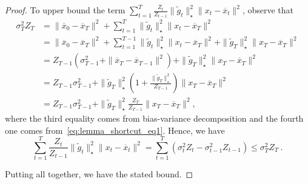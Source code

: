 \documentclass[12pt]{colt2018} %
\begin{document}
\begin{proof}
To upper bound the term $\sum_{t=1}^T \frac{Z_t}{Z_{t-1}}\|\tilde{g}_t\|_\star ^2\|x_t-\overline{x}_t\|^2$, observe that
\begin{align*}
\sigma_T^2 Z_T 
&=\|\overline{x}_0-\overline{x}_T\|^2+\sum_{t=1}^T \|\tilde{g}_t\|_\star ^2\|x_t-\overline{x}_T\|^2\\ 
&=\|\overline{x}_0-\overline{x}_T\|^2+\sum_{t=1}^{T-1} \|\tilde{g}_t\|_\star ^2\|x_t-\overline{x}_T\|^2 + \|\tilde{g}_T\|_\star ^2\|x_T-\overline{x}_T\|^2 \\
&= Z_{T-1}(\sigma_{T-1}^2+\|\overline{x}_T-\overline{x}_{T-1}\|^2) +\|\tilde{g}_T\|_\star ^2\|x_T-\overline{x}_T\|^2 \\
&= Z_{T-1}\sigma_{T-1}^2+\|\tilde{g}_T\|_\star ^2\left(1+\frac{\|\tilde{g}_T\|_\star ^2}{Z_{T-1}}\right)\|x_T-\overline{x}_T\|^2 \\
&= Z_{T-1}\sigma_{T-1}^2+\|\tilde{g}_T\|_\star ^2 \frac{Z_T}{Z_{T-1}} \|x_T-\overline{x}_T\|^2,
\end{align*}
where the third equality comes from bias-variance decomposition and the fourth one comes from~\eqref{eq:lemma_shortcut_eq1}. Hence, we have
\[
\sum_{t=1}^T \frac{Z_t}{Z_{t-1}} \|\tilde{g}_t\|_\star ^2\|x_t-\overline{x}_t\|^2 
= \sum_{t=1}^T (\sigma_t^2 Z_t - \sigma_{t-1}^2 Z_{t-1} ) \leq \sigma^2_T Z_T~.
\]

\begin{comment}
At the same time, we can use the boundedness of the domain to have
\begin{align*}
\sum_{t=1}^T \frac{\sqrt{Z_t} \|\tilde{g}_t\|_\star ^2}{Z_{t-1}}\|x_t-\overline{x}_t\|
&\leq \sum_{t=1}^T \frac{\sqrt{Z_t} \|\tilde{g}_t\|_\star ^2}{Z_{t-1}} D \\
&= D \sum_{t=1}^T \left(\frac{\sqrt{Z_t} \|\tilde{g}_t\|_\star ^2}{Z_{t}} + \frac{\sqrt{Z_t} \|\tilde{g}_t\|_\star ^2}{Z_{t-1}}-\frac{\sqrt{Z_t} \|\tilde{g}_t\|_\star ^2}{Z_{t}}\right)\\
&= D \sum_{t=1}^T \left(\frac{\|\tilde{g}_t\|_\star ^2}{\sqrt{Z_{t}}} + \frac{\sqrt{Z_t} \|\tilde{g}_t\|_\star ^2}{Z_{t-1}}-\frac{\sqrt{Z_t} \|\tilde{g}_t\|_\star ^2}{Z_{t}}\right)\\
&\leq D \sum_{t=1}^T \left(\frac{\|\tilde{g}_t\|_\star ^2}{\sqrt{Z_{t}}} + \frac{\sqrt{Z_T}}{Z_{t-1}}-\frac{\sqrt{Z_T}}{Z_{t}}\right)\\
&\leq D \left(\frac{\sqrt{Z_T}}{Z_0}+ \sum_{t=1}^T \frac{\|\tilde{g}_t\|_\star ^2}{\sqrt{Z_{t}}}\right) \\
&\leq D \sqrt{Z_T} \left(\frac{1}{Z_0}+ 2\right) \\
&= 3 D \sqrt{Z_T}~.
\end{align*}
\end{comment}
Putting all together, we have the stated bound.
\end{proof}
\end{document}

